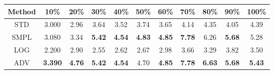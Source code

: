 \documentclass{standalone}
\begin{document}
\begin{tabular}{c|cccccccccc}
      \toprule
      Method & 10\% & 20\% & 30\% & 40\% & 50\% & 60\% & 70\% & 80\% & 90\% & 100\% \\
      \midrule
STD & 3.000 & 2.96 & 3.64 & 3.52 & 3.74 & 3.65 & 4.14 & 4.35 & 4.05 & 4.39\\
SMPL & 3.080 & 3.34 & \textbf{5.42} & \textbf{4.54} & \textbf{4.83} & \textbf{4.85} & \textbf{7.78} & 6.26 & \textbf{5.68} & 5.28\\
LOG & 2.200 & 2.90 & 2.55 & 2.62 & 2.67 & 2.98 & 3.66 & 3.29 & 3.82 & 3.50\\
ADV & \textbf{3.390} & \textbf{4.76} & \textbf{5.42} & \textbf{4.54} & 4.70 & \textbf{4.85} & \textbf{7.78} & \textbf{6.63} & \textbf{5.68} & \textbf{5.43}\\
  \bottomrule
\end{tabular}
\end{document}
